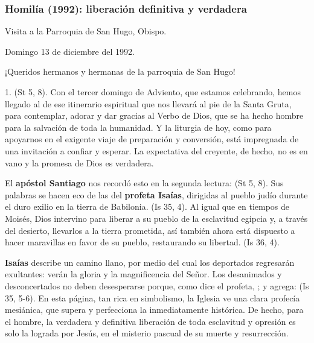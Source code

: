 \begin{body}
\begin{body}
\subsubsection{Homilía (1992): liberación definitiva y verdadera}

Visita a la Parroquia de San Hugo, Obispo.

Domingo 13 de diciembre del 1992.

¡Queridos hermanos y hermanas de la parroquia de San Hugo!

1.  (St 5, 8). Con el tercer domingo de Adviento, que estamos celebrando, hemos llegado al  de ese itinerario espiritual que nos llevará al pie de la Santa Gruta, para contemplar, adorar y dar gracias al Verbo de Dios, que se ha hecho hombre para la salvación de toda la humanidad. Y la liturgia de hoy, como para apoyarnos en el exigente viaje de preparación y conversión, está impregnada de una invitación a confiar y esperar. La expectativa del creyente, de hecho, no es en vano y la promesa de Dios es verdadera.

El \textbf{apóstol Santiago} nos recordó esto en la segunda lectura:  (St 5, 8). Sus palabras se hacen eco de las del \textbf{profeta Isaías}, dirigidas al pueblo judío durante el duro exilio en la tierra de Babilonia.  (Is 35, 4). Al igual que en tiempos de Moisés, Dios intervino para liberar a su pueblo de la esclavitud egipcia y, a través del desierto, llevarlos a la tierra prometida, así también ahora está dispuesto a hacer maravillas en favor de su pueblo, restaurando su libertad.  (Is 36, 4).

\textbf{Isaías} describe un camino llano, por medio del cual los deportados regresarán exultantes: verán la gloria y la magnificencia del Señor. Los desanimados y desconcertados no deben desesperarse porque, como dice el profeta, ; y agrega:  (Is 35, 5-6). En esta página, tan rica en simbolismo, la Iglesia ve una clara profecía mesiánica, que supera y perfecciona la inmediatamente histórica. De hecho, para el hombre, la verdadera y definitiva liberación de toda esclavitud y opresión es solo la lograda por Jesús, en el misterio pascual de su muerte y resurrección.


\end{body}
\end{body}
